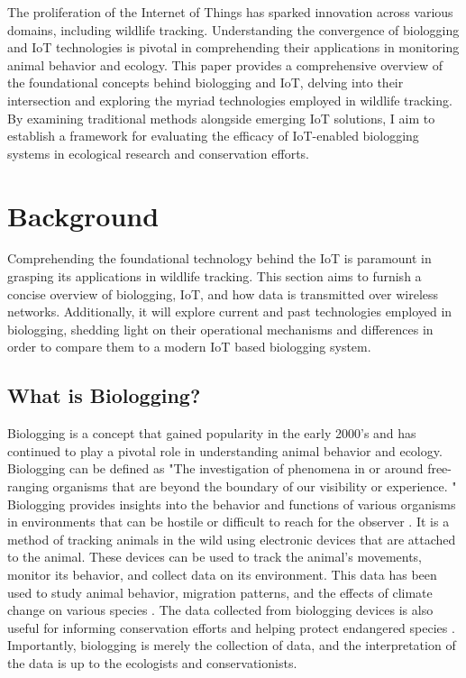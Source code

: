 \documentclass[sigplan,screen,nonacm]{acmart}
\begin{document}
The proliferation of the Internet of Things has sparked innovation across various domains, including 
wildlife tracking. Understanding the convergence of biologging and IoT technologies is pivotal in comprehending 
their applications in monitoring animal behavior and ecology. This paper provides a comprehensive overview of 
the foundational concepts behind biologging and IoT, delving into their intersection and exploring the myriad 
technologies employed in wildlife tracking. By examining traditional methods alongside emerging IoT solutions, 
I aim to establish a framework for evaluating the efficacy of IoT-enabled biologging systems in ecological 
research and conservation efforts.

\section{Background}
\label{sec:Background}

Comprehending the foundational technology behind the IoT
is paramount in grasping its applications in wildlife tracking. This section
aims to furnish a concise overview of biologging, IoT, and how data is transmitted 
over wireless networks. Additionally, it will explore current and past
technologies employed in biologging, shedding light on their operational
mechanisms and differences in order to compare them to a modern IoT based biologging 
system.

\subsection{What is Biologging?}
\label{subsec:What is Biologging}

Biologging is a concept that gained popularity in the early 2000's and has continued
to play a pivotal role in understanding animal behavior and ecology. Biologging can be
defined as "The investigation of phenomena in or around free-ranging organisms that are beyond
the boundary of our visibility or experience. \cite{boyd2004bio}" Biologging provides
insights into the behavior and functions of various organisms in environments that
can be hostile or difficult to reach for the observer \cite{boyd2004bio}.
It is a method of tracking animals in the wild using electronic devices that are
attached to the animal. These devices can be used to track the animal's
movements, monitor its behavior, and collect data on its environment. This data
has been used to study animal behavior, migration patterns, and the effects of climate change
on various species \cite{10.3389/fevo.2018.00092}. The data collected from biologging
devices is also useful for informing conservation efforts and helping protect endangered
species \cite{cooke2008biotelemetry}. Importantly, biologging is merely the collection of data, 
and the interpretation of the data is up to the ecologists and conservationists.
\end{document}
